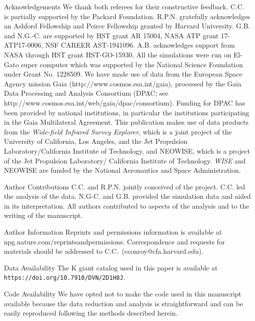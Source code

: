 \documentclass{natureprintstyle}
\begin{document}

%


\begin{addendum}
  
\item [Acknowledgements] We thank both referees for their constructive
  feedback.  C.C. is partially supported by the Packard
  Foundation.  R.P.N. gratefully acknowledges an Ashford Fellowship
  and Peirce Fellowship granted by Harvard University.  G.B.  and
  N.G.-C. are supported by HST grant AR 15004, NASA ATP grant
  17-ATP17-0006, NSF CAREER AST-1941096.  A.B. acknowledges support
  from NASA through HST grant HST-GO-15930.  All the simulations were
  run on El-Gato super computer which was supported by the National
  Science Foundation under Grant No. 1228509.  We have made use of
  data from the European Space Agency mission Gaia
  (http://www.cosmos.esa.int/gaia), processed by the Gaia Data
  Processing and Analysis Consortium (DPAC; see
  http://www.cosmos.esa.int/web/gaia/dpac/consortium). Funding for
  DPAC has been provided by national institutions, in particular the
  institutions participating in the Gaia Multilateral Agreement.  This
  publication makes use of data products from the {\it Wide-field
    Infrared Survey Explorer}, which is a joint project of the
  University of California, Los Angeles, and the Jet Propulsion
  Laboratory/California Institute of Technology, and NEOWISE, which is
  a project of the Jet Propulsion Laboratory/ California Institute of
  Technology.  {\it WISE} and NEOWISE are funded by the National
  Aeronautics and Space Administration.

\item[Author Contributions] C.C. and R.P.N. jointly conceived of the
  project.  C.C. led the analysis of the data.  N.G-C. and
  G.B. provided the simulation data and aided in its interpretation.
  All authors contributed to aspects of the analysis and to the
  writing of the manuscript.

\item[Author  Information]  Reprints and permissions
    information is available at npg.nature.com/reprintsandpermissions.
    Correspondence and requests for materials should be addressed to
    C.C.\ (cconroy@cfa.harvard.edu).

  \item[Data Availability] The K giant catalog used in this paper is
    available at \texttt{https://doi.org/10.7910/DVN/2D1H8J}.
    
  \item[Code Availability] We have opted not to make the code used in
    this manuscript available because the data reduction and analysis
    is straightforward and can be easily reproduced following the
    methods described herein.
    
\end{addendum}
\end{document}
